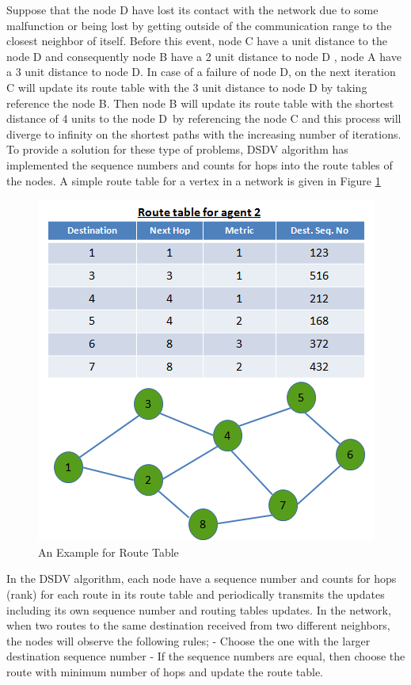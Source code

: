Suppose that the node D have lost its contact with the network due to some malfunction or being lost by getting outside of the communication range to the closest neighbor of itself. Before this event, node C have a unit distance to the node D and consequently node B have a 2 unit distance to node D , node A have a 3 unit distance to node D. In case of a failure of node D, on the next iteration C will update its route table with the 3 unit distance to node D by taking reference the node B. Then node B will update its route table with the shortest distance of 4 units to the node D\ by referencing the node C and this process will diverge to infinity on the shortest paths with the increasing number of iterations. To provide a solution for these type of problems, DSDV algorithm has implemented the sequence numbers and counts for hops into the route tables of the nodes. A simple route table for a vertex in a network is given in Figure \ref{dest_seq_ref}

\begin{figure}[H]
\caption{An Example for Route Table} \label{dest_seq_ref}
\centering
\includegraphics[scale = 0.75]{dest_seq}
\end{figure}

In the DSDV algorithm, each node have a sequence number and counts for hops (rank) for each route in its route table and periodically transmits the updates including its own sequence number and routing tables updates. In the network, when two routes to the same destination received from two different neighbors, the nodes will observe the following rules;\newline
	- Choose the one with the larger destination sequence number \newline
	- If the sequence numbers are equal, then choose the route with minimum number of hops and update the route table.
	
